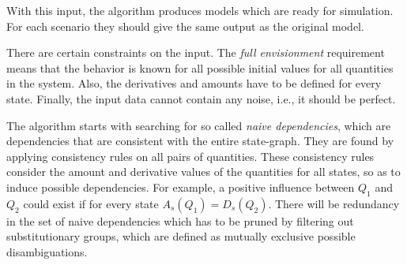 \documentclass{article} %
\begin{document}
With this input, the algorithm produces models which are ready for simulation.
For each scenario they should give the same output as the original model.

There are certain constraints on the input. The \emph{full envisionment}
requirement means that the behavior is known for all possible initial values
for all quantities in the system. Also, the derivatives and amounts have to be
defined for every state. Finally, the input data cannot contain any noise,
i.e., it should be perfect.

The algorithm starts with searching for so called \emph{naive dependencies},
which are dependencies that are consistent with the entire state-graph. They
are found by applying consistency rules on all pairs of quantities. These
consistency rules consider the amount and derivative values of the quantities
for all states, so as to induce possible dependencies. For example, a positive
influence between $Q_1$ and $Q_2$ could exist if for every state $A_s(Q_1) =
D_s(Q_2)$.  There will be redundancy in the set of naive dependencies which
has to be pruned by filtering out substitutionary groups, which are defined as
mutually exclusive possible disambiguations. 

%





\newpage
\end{document}
